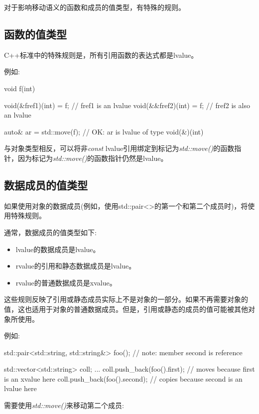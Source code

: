 对于影响移动语义的函数和成员的值类型，有特殊的规则。

\subsection{函数的值类型}

C++标准中的特殊规则是，所有引用函数的表达式都是lvalue。

例如:

\begin{cppcode}
void f(int) {
}

void(&fref1)(int) = f; // fref1 is an lvalue
void(&&fref2)(int) = f; // fref2 is also an lvalue

auto& ar = std::move(f); // OK: ar is lvalue of type void(&)(int)
\end{cppcode}

与对象类型相反，可以将非\textit{const} lvalue引用绑定到标记为\textit{std::move()}的函数指针，因为标记为\textit{std::move()}的函数指针仍然是lvalue。

\subsection{数据成员的值类型}

如果使用对象的数据成员(例如，使用std::pair<>的第一个和第二个成员时)，将使用特殊规则。

通常，数据成员的值类型如下:

\begin{itemize}
	\item lvalue的数据成员是lvalue。
	\item rvalue的引用和静态数据成员是lvalue。
	\item rvalue的普通数据成员是xvalue。
\end{itemize}

这些规则反映了引用或静态成员实际上不是对象的一部分。如果不再需要对象的值，这也适用于对象的普通数据成员。但是，引用或静态的成员的值可能被其他对象所使用。

例如:

\begin{cppcode}
std::pair<std::string, std::string&> foo(); // note: member second is reference

std::vector<std::string> coll;
...
coll.push_back(foo().first); // moves because first is an xvalue here
coll.push_back(foo().second); // copies because second is an lvalue here
\end{cppcode}

需要使用\textit{std::move()}来移动第二个成员:

